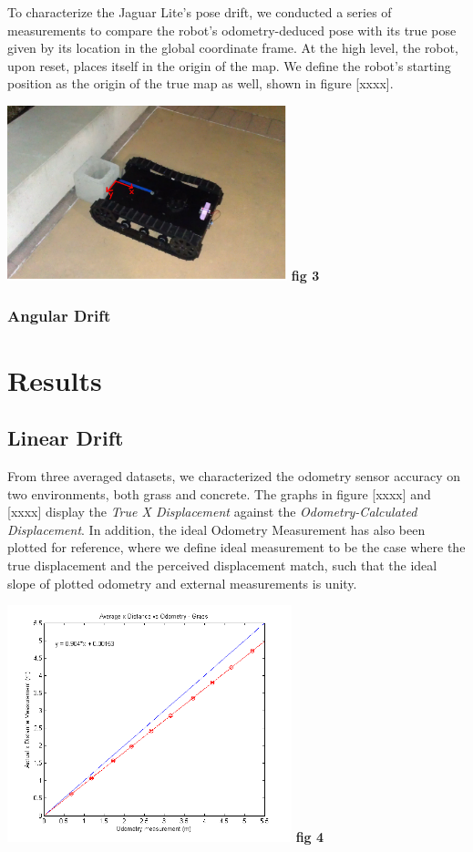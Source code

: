 \documentclass[conference]{IEEEtran}
\begin{document}
To characterize the Jaguar Lite's pose drift, we conducted a series 
of measurements to compare the robot's odometry-deduced pose with its true
 pose given by its location in the global coordinate frame.  At the high level, the 
robot, upon reset, places itself in the origin of the map.  We define the 
robot's starting position as the origin of the true map as well, shown in figure [xxxx].



\includegraphics[width = 3.2in]{origin.png}
\textbf{fig 3}

\subsubsection{Angular Drift}


\section{Results}
\subsection{Linear Drift}
From three averaged datasets, we characterized the odometry sensor accuracy on 
two environments, both grass and concrete. The graphs in figure [xxxx] and [xxxx] 
display the \emph{True X Displacement} against the \emph{Odometry-Calculated Displacement}.
In addition, the ideal Odometry Measurement has also been plotted for reference, 
where we define ideal measurement to be the case where the true displacement
and the perceived displacement match, such that the ideal slope of plotted odometry and external measurements is unity.


\includegraphics[width = 3.25in]{grass_avg.png}
\textbf{fig 4}
\end{document}
